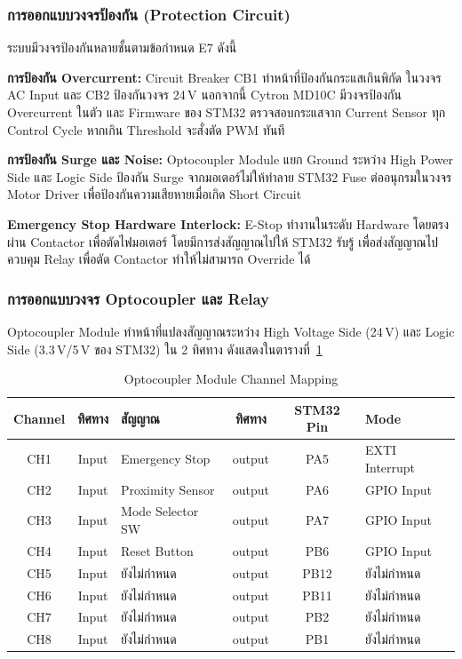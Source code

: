 \subsubsection{การออกแบบวงจรป้องกัน (Protection Circuit)}
\label{subsubsec:protection_circuit}

ระบบมีวงจรป้องกันหลายชั้นตามข้อกำหนด E7 ดังนี้

\textbf{การป้องกัน Overcurrent:}
Circuit Breaker CB1 ทำหน้าที่ป้องกันกระแสเกินพิกัด
ในวงจร AC Input และ CB2 ป้องกันวงจร 24\,V
นอกจากนี้ Cytron MD10C มีวงจรป้องกัน Overcurrent ในตัว
และ Firmware ของ STM32 ตรวจสอบกระแสจาก Current Sensor
ทุก Control Cycle หากเกิน Threshold จะสั่งตัด PWM ทันที

\textbf{การป้องกัน Surge และ Noise:}
Optocoupler Module แยก Ground ระหว่าง High Power Side
และ Logic Side ป้องกัน Surge จากมอเตอร์ไม่ให้ทำลาย STM32
Fuse ต่ออนุกรมในวงจร Motor Driver
เพื่อป้องกันความเสียหายเมื่อเกิด Short Circuit

\textbf{Emergency Stop Hardware Interlock:}
E-Stop ทำงานในระดับ Hardware โดยตรงผ่าน Contactor 
เพื่อตัดไฟมอเตอร์ โดยมีการส่งสัญญาณไปให้ 
STM32 รับรู้ เพื่อส่งสัญญาณไปควบคุม Relay เพื่อตัด Contactor 
ทำให้ไม่สามารถ Override ได้ 

\subsubsection{การออกแบบวงจร Optocoupler และ Relay}
\label{subsubsec:optocoupler_relay_design}

Optocoupler Module ทำหน้าที่แปลงสัญญาณระหว่าง
High Voltage Side (24\,V) และ Logic Side (3.3\,V/5\,V ของ STM32)
ใน 2 ทิศทาง ดังแสดงในตารางที่~\ref{tab:opto_mapping}

\begin{table}[H]
  \centering
  \caption{Optocoupler Module Channel Mapping}
  \label{tab:opto_mapping}
  \begin{tabular}{cclccl}
    \toprule
    Channel & ทิศทาง & สัญญาณ & ทิศทาง & STM32 Pin & Mode \\
    \midrule
    CH1 & Input  & Emergency Stop   & output   & PA5  & EXTI Interrupt \\
    CH2 & Input  & Proximity Sensor & output   & PA6  & GPIO Input \\
    CH3 & Input  & Mode Selector SW & output   & PA7  & GPIO Input \\
    CH4 & Input  & Reset Button     & output   & PB6  & GPIO Input \\
    CH5 & Input & ยังไม่กำหนด       & output    & PB12 & ยังไม่กำหนด \\
    CH6 & Input & ยังไม่กำหนด       & output    & PB11 & ยังไม่กำหนด \\
    CH7 & Input & ยังไม่กำหนด       & output    & PB2 & ยังไม่กำหนด \\
    CH8 & Input & ยังไม่กำหนด       & output    & PB1  & ยังไม่กำหนด \\
    \bottomrule
  \end{tabular}
\end{table}


